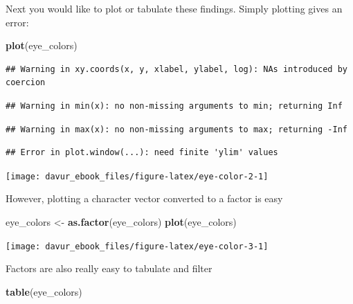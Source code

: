 \documentclass[]{book}
\newenvironment{Shaded}{\begin{snugshade}}{\end{snugshade}}
\newcommand{\KeywordTok}[1]{\textcolor[rgb]{0.13,0.29,0.53}{\textbf{#1}}}
\newcommand{\NormalTok}[1]{#1}
\newcommand{\StringTok}[1]{\textcolor[rgb]{0.31,0.60,0.02}{#1}}
\begin{document}
Next you would like to plot or tabulate these findings. Simply plotting gives an error:

\begin{Shaded}
\begin{Highlighting}[]
\KeywordTok{plot}\NormalTok{(eye_colors)}
\end{Highlighting}
\end{Shaded}

\begin{verbatim}
## Warning in xy.coords(x, y, xlabel, ylabel, log): NAs introduced by coercion
\end{verbatim}

\begin{verbatim}
## Warning in min(x): no non-missing arguments to min; returning Inf
\end{verbatim}

\begin{verbatim}
## Warning in max(x): no non-missing arguments to max; returning -Inf
\end{verbatim}

\begin{verbatim}
## Error in plot.window(...): need finite 'ylim' values
\end{verbatim}

\begin{center}\texttt{[image: davur\_ebook\_files/figure-latex/eye-color-2-1]} \end{center}

However, plotting a character vector converted to a factor is easy

\begin{Shaded}
\begin{Highlighting}[]
\NormalTok{eye_colors <-}\StringTok{ }\KeywordTok{as.factor}\NormalTok{(eye_colors)}
\KeywordTok{plot}\NormalTok{(eye_colors)}
\end{Highlighting}
\end{Shaded}

\begin{center}\texttt{[image: davur\_ebook\_files/figure-latex/eye-color-3-1]} \end{center}

Factors are also really easy to tabulate and filter

\begin{Shaded}
\begin{Highlighting}[]
\KeywordTok{table}\NormalTok{(eye_colors)}
\end{Highlighting}
\end{Shaded}
\end{document}
